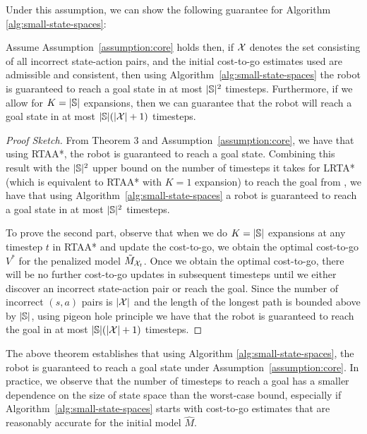 Under this assumption, we can show
the following guarantee for
Algorithm \ref{alg:small-state-spaces}:
\begin{theorem}
  Assume Assumption~\ref{assumption:core} holds then, if $\mathcal{X}$ denotes
  the set consisting of all incorrect state-action
  pairs, and the initial cost-to-go estimates used are
  admissible and consistent, then using Algorithm~\ref{alg:small-state-spaces}
  the robot is guaranteed to reach a goal state in at most
  $|\mathbb{S}|^2$ timesteps. Furthermore, if we allow for $K =
  |\mathbb{S}|$ expansions, then we can guarantee that the
  robot will reach a goal state
  in at most $|\mathbb{S}|(|\mathcal{X}|+1)$ timesteps.
  \label{thm:small-state-spaces}
\end{theorem}
\begin{proof}[Proof Sketch]
  From \cite{DBLP:conf/atal/KoenigL06} Theorem 3 and
Assumption~\ref{assumption:core}, we have that using
RTAA*, the robot is guaranteed to reach a goal state. Combining this
result with the $|\mathbb{S}|^2$ upper bound on the number of timesteps it takes for LRTA*
(which is equivalent to RTAA* with $K=1$ expansion) to reach the goal
from \cite{DBLP:conf/aaai/KoenigS93}, we have that using Algorithm~\ref{alg:small-state-spaces} a
robot is guaranteed to reach a goal state in at most $|\mathbb{S}|^2$
timesteps.

To prove the second part, observe that when we do $K = |\mathbb{S}|$
expansions at any timestep $t$ in RTAA* and update the cost-to-go, we obtain the optimal
cost-to-go $V^*$ for the penalized model
$\tilde{M}_{\mathcal{X}_t}$. Once we obtain the optimal cost-to-go,
there will be no further cost-to-go updates in subsequent timesteps
until we either discover an incorrect state-action pair or reach the
goal. Since the number of incorrect $(s, a)$ pairs is
$|\mathcal{X}|$ and the length of the longest path is bounded
above by $|\mathbb{S}|$, using pigeon hole principle we have
that the robot is guaranteed to reach the goal in at most
$|\mathbb{S}|(|\mathcal{X}| + 1)$ timesteps.
\end{proof}
The above
theorem establishes that using Algorithm 
\ref{alg:small-state-spaces}, the robot is guaranteed to reach a goal
state under Assumption~\ref{assumption:core}. In
practice, we observe that the number of timesteps to reach a goal has a smaller
dependence on the size of state space than the
worst-case bound, especially if Algorithm~\ref{alg:small-state-spaces}
starts with cost-to-go estimates that are reasonably accurate for the
initial model $\hat{M}$. %

